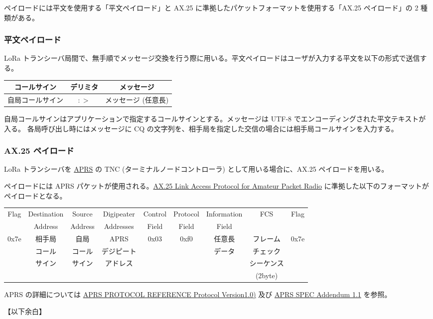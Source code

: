 \documentclass[a4j,oneside]{ujbook}
\begin{document}
ペイロードには平文を使用する「平文ペイロード」と AX.25 に準拠したパケットフォーマットを使用する「AX.25 ペイロード」の 2 種類がある。

\subsubsection*{平文ペイロード}

LoRa トランシーバ局間で、無手順でメッセージ交換を行う際に用いる。平文ペイロードはユーザが入力する平文を以下の形式で送信する。

\begin{center}
 \begin{tabular}{|c|c|c|}
  \hline
  {コールサイン} & {デリミタ} & {メッセージ} \\
  \hline
  {自局コールサイン} & {$:>$} & {メッセージ (任意長)} \\
  \hline
 \end{tabular}
\end{center}

自局コールサインはアプリケーションで指定するコールサインとする。メッセージは UTF-8 でエンコーディングされた平文テキストが入る。
各局呼び出し時にはメッセージに CQ の文字列を、相手局を指定した交信の場合には相手局コールサインを入力する。

\subsubsection*{AX.25 ペイロード}
LoRa トランシーバを \href{http://www.aprs.org/doc/APRS101.PDF}{APRS} の TNC (ターミナルノードコントローラ) として用いる場合に、AX.25 ペイロードを用いる。

ペイロードには APRS パケットが使用される。\href{https://www.tapr.org/pdf/AX25.2.2.pdf}{AX.25 Link Access Protocol for Amateur Packet Radio} に準拠した以下のフォーマットがペイロードとなる。

\begin{center}
 \begin{tabular}{|c|c|c|c|c|c|c|c|c|}
  \hline
  {Flag} & {Destination} & {Source} & {Digipeater} & {Control} & {Protocol} & {Information} & {FCS} & {Flag} \\
  {} & {Address} & {Address} & {Addresses} & {Field} & {Field} & {Field} & {} & {} \\
  \hline
  {0x7e} & {相手局} & {自局} & {APRS} & {0x03} & {0xf0} & {任意長} & {フレーム} & {0x7e} \\
  {} & {コール} & {コール} & {デジピート} & {} & {} & {データ} & {チェック} & {} \\
  {} & {サイン} & {サイン} & {アドレス} & {} & {} & {} & {シーケンス} & {} \\
  {} & {} & {} & {} & {} & {} & {} & {(2byte)} & {} \\
  \hline
 \end{tabular}
\end{center}

APRS の詳細については \href{http://www.aprs.org/doc/APRS101.PDF}{APRS PROTOCOL REFERENCE Protocol Version1.0)} 及び \href{http://www.aprs.org/aprs11.html}{APRS SPEC Addendum 1.1} を参照。

\vspace{1cm}
【以下余白】
\end{document}
